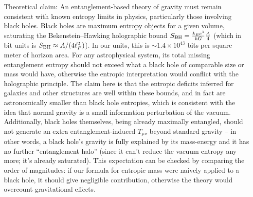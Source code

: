 \documentclass[11pt]{article}
\begin{document}
Theoretical claim: An entanglement-based theory of gravity must remain consistent with known entropy limits in physics, particularly those involving black holes. Black holes are maximum entropy objects for a given volume, saturating the Bekenstein–Hawking holographic bound $S_{\rm BH} = \frac{k_Bc^3}{\hbar G} \frac{A}{4}$ (which in bit units is $S_{\rm BH}\approx A/(4\ell_P^2)$). In our units, this is $\sim 1.4\times10^{43}$ bits per square meter of horizon area. For any astrophysical system, its total missing entanglement entropy should not exceed what a black hole of comparable size or mass would have, otherwise the entropic interpretation would conflict with the holographic principle. The claim here is that the entropic deficits inferred for galaxies and other structures are well within these bounds, and in fact are astronomically smaller than black hole entropies, which is consistent with the idea that normal gravity is a small information perturbation of the vacuum. Additionally, black holes themselves, being already maximally entangled, should not generate an extra entanglement-induced $T_{\mu\nu}$ beyond standard gravity – in other words, a black hole’s gravity is fully explained by its mass-energy and it has no further “entanglement halo” (since it can’t reduce the vacuum entropy any more; it’s already saturated). This expectation can be checked by comparing the order of magnitudes: if our formula for entropic mass were naively applied to a black hole, it should give negligible contribution, otherwise the theory would overcount gravitational effects.
\end{document}
